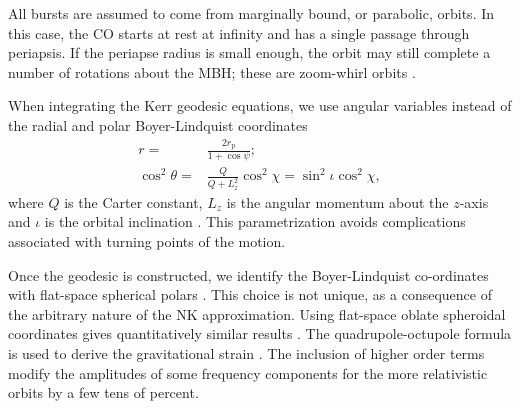 \documentclass[useAMS,usedcolumn,usegraphicx,usenatbib]{mn2e}
\newcommand{\sub}[1]{\ensuremath{_\mathrm{#1}}}
\begin{document}
All bursts are assumed to come from marginally bound, or parabolic, orbits. In this case, the CO starts at rest at infinity and has a single passage through periapsis. If the periapse radius is small enough, the orbit may still complete a number of rotations about the MBH; these are zoom-whirl orbits \citep{Glampedakis2002a}.

When integrating the Kerr geodesic equations, we use angular variables instead of the radial and polar Boyer-Lindquist coordinates \citep{Drasco2004}
\begin{align}
r = {} & \frac{2 r\sub{p}}{1 + \cos\psi};\\
\cos^2\theta = {} & \frac{Q}{Q+L_z^2}\cos^2\chi = \sin^2 \iota \cos^2\chi,
\end{align}
where $Q$ is the Carter constant, $L_z$ is the angular momentum about the $z$-axis and $\iota$ is the orbital inclination \citep*{Glampedakis2002}. This parametrization avoids complications associated with turning points of the motion.

Once the geodesic is constructed, we identify the Boyer-Lindquist co-ordinates with flat-space spherical polars \citep{Gair2005, Babak2007}. This choice is not unique, as a consequence of the arbitrary nature of the NK approximation. Using flat-space oblate spheroidal coordinates gives quantitatively similar results \citep{Berry2013}. The quadrupole-octupole formula is used to derive the gravitational strain \citep{Bekenstein1973, Press1977, Yunes2008}. The inclusion of higher order terms modify the amplitudes of some frequency components for the more relativistic orbits by a few tens of percent.
\end{document}
